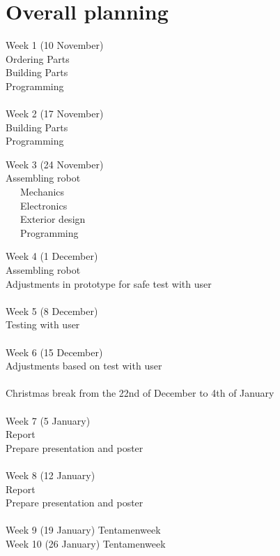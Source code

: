 \documentclass[11pt,twoside,a4paper]{report}
\begin{document}
\section {Overall planning}
Week 1 (10 November)\\
Ordering Parts\\
Building Parts\\
Programming\\
\\
Week 2 (17 November)\\
Building Parts\\
Programming
\begin{tabbing}
Week 3 (24 November)\\
Assembling robot\\
~~~Mechanics\\
~~~Electronics\\
~~~Exterior design\\
~~~Programming
\end{tabbing}
Week 4 (1 December)\\
Assembling robot\\
Adjustments in prototype for safe test with user\\
\\
Week 5 (8 December)\\
Testing with user\\
\\
Week 6 (15 December)\\
Adjustments based on test with user\\
\\
Christmas break from the 22nd of December to 4th of January\\
\\
Week 7 (5 January)\\
Report\\
Prepare presentation and poster\\
\\
Week 8 (12 January)\\
Report\\
Prepare presentation and poster\\
\\
Week 9 (19 January) Tentamenweek\\
Week 10 (26 January) Tentamenweek
\end{document}

